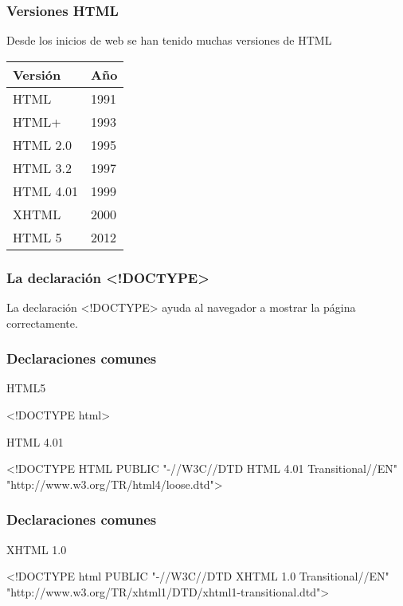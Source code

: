 \documentclass[12pt,a4paper]{beamer}
\begin{document}
\begin{frame}
	\frametitle{Versiones HTML}
	
	Desde los inicios de web se han tenido muchas versiones de HTML
	
	\begin{center}
		\begin{tabular}{|l|l|}
			\hline
			Versión & 	Año\\
			\hline
			HTML	&	1991\\
			HTML+	&	1993\\
			HTML 2.0	&	1995\\
			HTML 3.2	&	1997\\
			HTML 4.01	&	1999\\
			XHTML	&	2000\\
			HTML 5	&	2012\\
			\hline
		\end{tabular}
	\end{center}
	
\end{frame}

\begin{frame}
	\frametitle{La declaración <!DOCTYPE>}
	
	La declaración <!DOCTYPE> ayuda al navegador a mostrar la página correctamente.	
\end{frame}

\begin{frame}
	\frametitle{Declaraciones comunes}
	
	HTML5
	\begin{framed}
		<!DOCTYPE html>
	\end{framed}

	
	HTML 4.01
	\begin{framed}
		<!DOCTYPE HTML PUBLIC "-//W3C//DTD HTML 4.01 Transitional//EN" "http://www.w3.org/TR/html4/loose.dtd">
	\end{framed}	
	
	

\end{frame}

\begin{frame}
	\frametitle{Declaraciones comunes}
	
	XHTML 1.0
	\begin{framed}
		<!DOCTYPE html PUBLIC "-//W3C//DTD XHTML 1.0 Transitional//EN" "http://www.w3.org/TR/xhtml1/DTD/xhtml1-transitional.dtd"> 
	\end{framed}
\end{frame}
\end{document}
